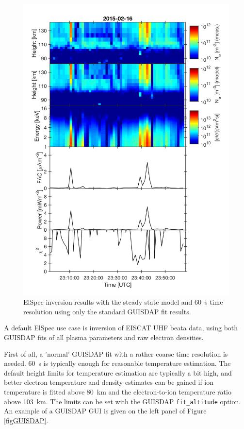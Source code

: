 \documentclass[12pt,a4paper]{report}
\begin{document}
\begin{figure}[ht]
\begin{center}
\includegraphics[width=\textwidth]{ElSpec_20150216T230130-20150216T235900_beata_uhf_Fang_SheehanGr_equilibrium_1_1_dump.png}
\caption{ElSpec inversion results with the steady state model and 60~s time resolution using only the standard GUISDAP fit results.}
\label{figElSpecOutEquilibrium60s}
\end{center}
\end{figure}

A default ElSpec use case is inversion of EISCAT UHF beata data, using both GUISDAP fits of all plasma parameters and raw electron densities. 

First of all, a 'normal' GUISDAP fit with a rather coarse time resolution is needed. 60~s is typically enough for reasonable temperature estimation. The default height limits for temperature estimation are typically a bit high, and better electron temperature and density estimates can be gained if ion temperature is fitted above 80~km and the electron-to-ion temperature ratio above 103~km. The limits can be set with the GUISDAP \verb|fit_altitude| option. An example of a GUISDAP GUI is given on the left panel of Figure \ref{figGUISDAP}.
\end{document}
